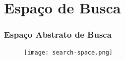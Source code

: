 \section{Espaço de Busca}

\begin{frame}[fragile]
  \frametitle{Espaço Abstrato de Busca}
  \begin{figure}
    \centering
    \texttt{[image: search-space.png]}
  \end{figure}
\end{frame}
